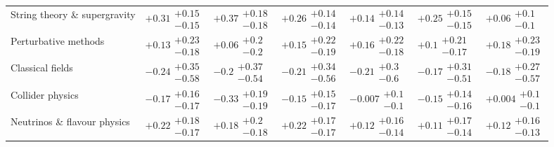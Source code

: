 \begin{table}[H]
\begin{tabular}{lllllll}
String theory \& supergravity & $\bm{+0.31}\substack{+0.15 \\ -0.15}$ & $\bm{+0.37}\substack{+0.18 \\ -0.18}$ & $\bm{+0.26}\substack{+0.14 \\ -0.14}$ & $\bm{+0.14}\substack{+0.14 \\ -0.13}$ & $\bm{+0.25}\substack{+0.15 \\ -0.15}$ & $+0.06\substack{+0.1 \\ -0.1}$ \\
Perturbative methods & $+0.13\substack{+0.23 \\ -0.18}$ & $+0.06\substack{+0.2 \\ -0.2}$ & $+0.15\substack{+0.22 \\ -0.19}$ & $+0.16\substack{+0.22 \\ -0.18}$ & $+0.1\substack{+0.21 \\ -0.17}$ & $+0.18\substack{+0.23 \\ -0.19}$ \\
Classical fields & $-0.24\substack{+0.35 \\ -0.58}$ & $-0.2\substack{+0.37 \\ -0.54}$ & $-0.21\substack{+0.34 \\ -0.56}$ & $-0.21\substack{+0.3 \\ -0.6}$ & $-0.17\substack{+0.31 \\ -0.51}$ & $-0.18\substack{+0.27 \\ -0.57}$ \\
Collider physics & $\bm{-0.17}\substack{+0.16 \\ -0.17}$ & $\bm{-0.33}\substack{+0.19 \\ -0.19}$ & $-0.15\substack{+0.15 \\ -0.17}$ & $-0.007\substack{+0.1 \\ -0.1}$ & $\bm{-0.15}\substack{+0.14 \\ -0.16}$ & $+0.004\substack{+0.1 \\ -0.1}$ \\
Neutrinos \& flavour physics & $\bm{+0.22}\substack{+0.18 \\ -0.17}$ & $+0.18\substack{+0.2 \\ -0.18}$ & $\bm{+0.22}\substack{+0.17 \\ -0.17}$ & $+0.12\substack{+0.16 \\ -0.14}$ & $+0.11\substack{+0.17 \\ -0.14}$ & $+0.12\substack{+0.16 \\ -0.13}$ \\

\end{tabular}
\end{table}
